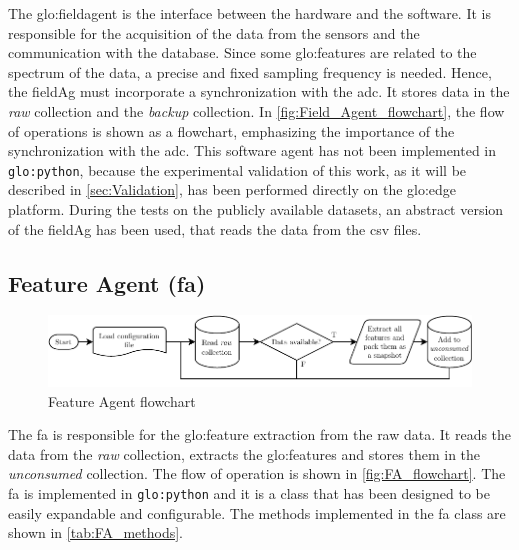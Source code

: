 The \gls{glo:fieldagent} is the interface between the hardware and the software. It is responsible for the acquisition of the data from the sensors and the communication with the database. Since some \gls{glo:feature}s are related to the spectrum of the data, a precise and fixed sampling frequency is needed. Hence, the \gls{fieldAg} must incorporate a synchronization with the \gls{adc}. It stores data in the \emph{raw} collection and the \emph{backup} collection. In \autoref{fig:Field_Agent_flowchart}, the flow of operations is shown as a flowchart, emphasizing the importance of the synchronization with the \gls{adc}. This software agent has not been implemented in \texttt{\gls{glo:python}}, because the experimental validation of this work, as it will be described in \autoref{sec:Validation}, has been performed directly on the \gls{glo:edge} platform. During the tests on the publicly available datasets, an abstract version of the \gls{fieldAg} has been used, that reads the data from the \gls{csv} files.


\subsection{Feature Agent (\gls{fa})}
\label{subsec:FeatureAgent}
\begin{figure}
    \centering
    \includegraphics[width=\textwidth]{images/Framework/FA_flowchart.pdf}
    \caption{Feature Agent flowchart}
    \label{fig:FA_flowchart}
\end{figure}

The \gls{fa} is responsible for the \gls{glo:feature} extraction from the raw data. It reads the data from the \emph{raw} collection, extracts the \gls{glo:feature}s and stores them in the \emph{unconsumed} collection. The flow of operation is shown in \autoref{fig:FA_flowchart}. The \gls{fa} is implemented in \texttt{\gls{glo:python}} and it is a class that has been designed to be easily expandable and configurable. The methods implemented in the \gls{fa} class are shown in \autoref{tab:FA_methods}.


